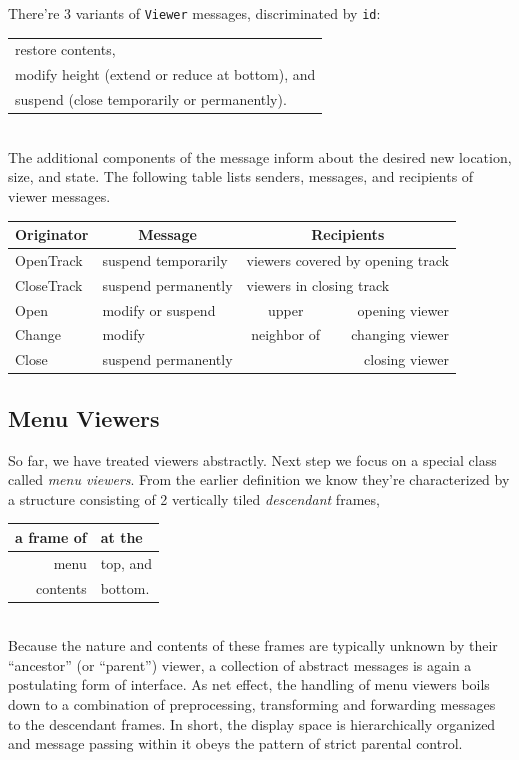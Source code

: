 There're 3 variants of \verb|Viewer| messages, discriminated by \verb|id|:
\begin{table}[h!]
  \centering
  \begin{tabular}{l}
    restore contents, \\
    modify height (extend or reduce at bottom), and \\
    suspend (close temporarily or permanently).
  \end{tabular}
\end{table}
\\The additional components of the message inform about the desired new location, size, and state.
The following table lists senders, messages, and recipients of viewer messages.
\begin{table}[h!]
  \setlength{\tabcolsep}{1pt}
  \begin{tabular}{l|l|c r}
    \small{Originator} & \multicolumn{1}{c}{Message} & \multicolumn{2}{|c}{Recipients} \\\hline
    \small{OpenTrack}  & \small{suspend temporarily}
                       & \multicolumn{2}{l}{\small{viewers covered by opening track}} \\
    \small{CloseTrack} & \small{suspend permanently}
                       & \multicolumn{2}{l}{\small{viewers in closing track}}         \\
    \small{Open}       & \small{modify or suspend}
                       &        upper        &  opening viewer \\
    \small{Change}     & \small{modify}
                       & \small{neighbor of} & changing viewer \\
    \small{Close}      & \small{suspend permanently} & \multicolumn{2}{r}{closing viewer}
  \end{tabular}
\end{table}

\subsection{Menu Viewers}
So far, we have treated viewers abstractly.
Next step we focus on a special class called \emph{menu viewers}.
From the earlier definition we know they're characterized by a structure
consisting of 2 vertically tiled \emph{descendant} frames,
\begin{table}[h!]
  \centering
  \begin{tabular}{r l}
    a frame of & at the \\\hline
    menu       & top, and \\
    contents   & bottom.
  \end{tabular}
\end{table}
\\Because the nature and contents of these frames are typically unknown
by their “ancestor” (or “parent”) viewer,
a collection of abstract messages is again a postulating form of interface.
As net effect, the handling of menu viewers boils down to a combination
of preprocessing, transforming and forwarding messages to the descendant frames.
In short, the display space is hierarchically organized and message passing within it
obeys the pattern of strict parental control.

